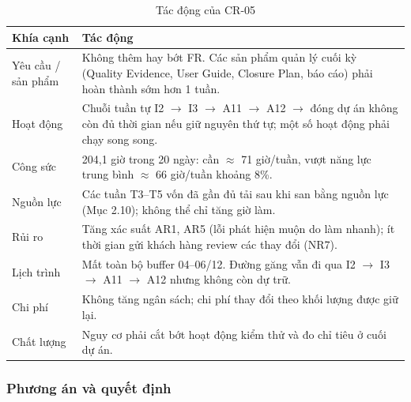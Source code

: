 \begin{table}[H]
\centering\small
\caption{Tác động của CR-05}\label{tab:t3-cr05-impact}
\begin{tabularx}{\linewidth}{@{}p{.18\linewidth}X@{}}
\toprule
\textbf{Khía cạnh} & \textbf{Tác động}\\\midrule
Yêu cầu / sản phẩm & Không thêm hay bớt FR. Các sản phẩm quản lý cuối kỳ (Quality Evidence, User Guide, Closure Plan, báo cáo) phải hoàn thành sớm hơn 1 tuần.\\
Hoạt động & Chuỗi tuần tự I2 $\to$ I3 $\to$ A11 $\to$ A12 $\to$ đóng dự án không còn đủ thời gian nếu giữ nguyên thứ tự; một số hoạt động phải chạy song song.\\
Công sức & 204,1 giờ trong 20 ngày: cần $\approx$ 71 giờ/tuần, vượt năng lực trung bình $\approx$ 66 giờ/tuần khoảng 8\%.\\
Nguồn lực & Các tuần T3--T5 vốn đã gần đủ tải sau khi san bằng nguồn lực (Mục 2.10); không thể chỉ tăng giờ làm.\\
Rủi ro & Tăng xác suất AR1, AR5 (lỗi phát hiện muộn do làm nhanh); ít thời gian gửi khách hàng review các thay đổi (NR7).\\
Lịch trình & Mất toàn bộ buffer 04--06/12. Đường găng vẫn đi qua I2 $\to$ I3 $\to$ A11 $\to$ A12 nhưng không còn dự trữ.\\
Chi phí & Không tăng ngân sách; chi phí thay đổi theo khối lượng được giữ lại.\\
Chất lượng & Nguy cơ phải cắt bớt hoạt động kiểm thử và đo chỉ tiêu ở cuối dự án.\\
\bottomrule
\end{tabularx}
\end{table}

\subsubsection{Phương án và quyết định}

